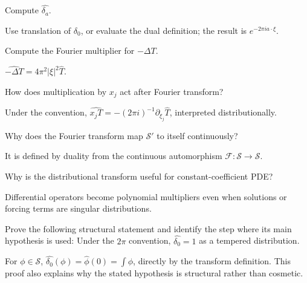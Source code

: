 \begin{problem}\label{prob:iii19-problem-04}
Compute \(\widehat{\delta_a}\).
\end{problem}
\begin{solution}
Use translation of \(\delta_0\), or evaluate the dual definition; the
result is \(e^{-2\pi ia\cdot\xi}\).
\end{solution}

\begin{problem}\label{prob:iii19-problem-05}
Compute the Fourier multiplier for \(-\Delta T\).
\end{problem}
\begin{solution}
\(\widehat{-\Delta T}=4\pi^2|\xi|^2\widehat T\).
\end{solution}

\begin{problem}\label{prob:iii19-problem-06}
How does multiplication by \(x_j\) act after Fourier transform?
\end{problem}
\begin{solution}
Under the convention,
\(\widehat{x_jT}=-(2\pi i)^{-1}\partial_{\xi_j}\widehat T\), interpreted
distributionally.
\end{solution}

\begin{problem}\label{prob:iii19-problem-07}
Why does the Fourier transform map \(\mathcal S'\) to itself continuously?
\end{problem}
\begin{solution}
It is defined by duality from the continuous automorphism
\(\mathcal F:\mathcal S\to\mathcal S\).
\end{solution}

\begin{problem}\label{prob:iii19-problem-08}
Why is the distributional transform useful for constant-coefficient PDE?
\end{problem}
\begin{solution}
Differential operators become polynomial multipliers even when solutions or
forcing terms are singular distributions.
\end{solution}

\begin{problem}\label{prob:iii19-problem-09}
Prove the following structural statement and identify the step where its main hypothesis is used: Under the $2\pi$ convention, $\widehat{\delta_0}=1$ as a tempered distribution.
\end{problem}
\begin{solution}
For $\phi\in\mathcal S$, $\widehat{\delta_0}(\phi)=\widehat\phi(0)=\int\phi$, directly by the transform definition. This proof also explains why the stated hypothesis is structural rather than cosmetic.
\end{solution}

